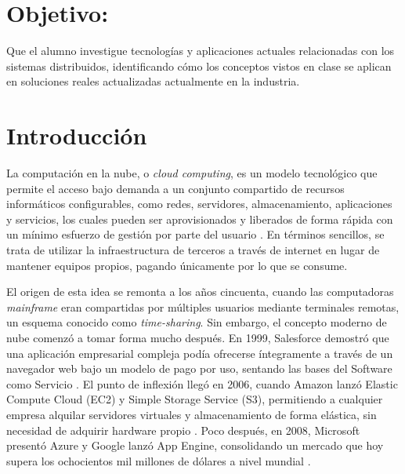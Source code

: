\documentclass[letterpaper,11pt]{article}
\begin{document}
    

    \newpage
    {\hypersetup{linkcolor=black}\tableofcontents}
    
    \newpage

    \setcounter{page}{1}

    \section{Objetivo:}
    Que el alumno investigue tecnologías y aplicaciones actuales relacionadas con los sistemas distribuidos,
    identificando cómo los conceptos vistos en clase se aplican en soluciones reales actualizadas actualmente en la industria.

    \section{Introducción}

    La computación en la nube, o \textit{cloud computing}, es un modelo tecnológico que permite el acceso bajo demanda a un conjunto compartido de recursos informáticos configurables, como redes, servidores, almacenamiento, aplicaciones y servicios, los cuales pueden ser aprovisionados y liberados de forma rápida con un mínimo esfuerzo de gestión por parte del usuario \parencite{nist-sp800-145}. En términos sencillos, se trata de utilizar la infraestructura de terceros a través de internet en lugar de mantener equipos propios, pagando únicamente por lo que se consume.

    El origen de esta idea se remonta a los años cincuenta, cuando las computadoras \textit{mainframe} eran compartidas por múltiples usuarios mediante terminales remotas, un esquema conocido como \textit{time-sharing}. Sin embargo, el concepto moderno de nube comenzó a tomar forma mucho después. En 1999, Salesforce demostró que una aplicación empresarial compleja podía ofrecerse íntegramente a través de un navegador web bajo un modelo de pago por uso, sentando las bases del Software como Servicio \parencite{clearfuze-history}. El punto de inflexión llegó en 2006, cuando Amazon lanzó Elastic Compute Cloud (EC2) y Simple Storage Service (S3), permitiendo a cualquier empresa alquilar servidores virtuales y almacenamiento de forma elástica, sin necesidad de adquirir hardware propio \parencite{computerhistory-cloud2006}. Poco después, en 2008, Microsoft presentó Azure y Google lanzó App Engine, consolidando un mercado que hoy supera los ochocientos mil millones de dólares a nivel mundial \parencite{programminghelper-market2026}.
\end{document}
